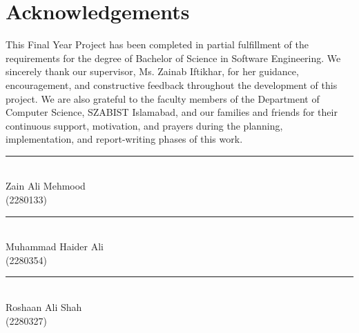 \newpage
\thispagestyle{empty}

\chapter*{\centering Acknowledgements}
\par\bigskip
This Final Year Project has been completed in partial fulfillment of the requirements for the degree of Bachelor of Science in Software Engineering. We sincerely thank our supervisor, Ms. Zainab Iftikhar, for her guidance, encouragement, and constructive feedback throughout the development of this project. We are also grateful to the faculty members of the Department of Computer Science, SZABIST Islamabad, and our families and friends for their continuous support, motivation, and prayers during the planning, implementation, and report-writing phases of this work.

\vspace{2cm}

\noindent
\begin{minipage}{0.45\textwidth}
\rule{6cm}{0.4pt}\\[4pt]
Zain Ali Mehmood\\
(2280133)
\end{minipage}
\hfill
\begin{minipage}{0.45\textwidth}
\rule{6cm}{0.4pt}\\[4pt]
Muhammad Haider Ali\\
(2280354)
\end{minipage}

\vspace{1.8cm}

\noindent
\begin{minipage}{0.45\textwidth}
\rule{6cm}{0.4pt}\\[4pt]
Roshaan Ali Shah\\
(2280327)
\end{minipage}
